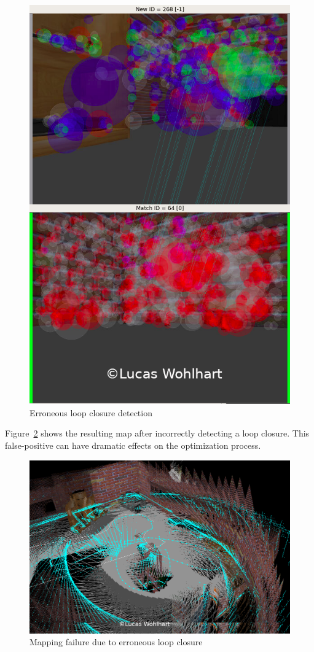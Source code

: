 \documentclass[10pt,journal,compsoc]{IEEEtran}
\begin{document}
\begin{figure}[thpb]
      \centering
      \includegraphics[width=0.65\linewidth]{img/erroneous_loop_closure_detection}
      \caption{Erroneous loop closure detection}
      \label{fig:erroneous_loop_closure_detection}
\end{figure}

Figure~\ref{fig:erroneous_loop_closure_detection_1_map} shows the resulting map after incorrectly detecting a loop closure. This false-positive can have dramatic effects on the optimization process.

\begin{figure}[thpb]
      \centering
      \includegraphics[width=\linewidth]{img/erroneous_loop_closure_detection_1_map.png}
      \caption{Mapping failure due to erroneous loop closure}
      \label{fig:erroneous_loop_closure_detection_1_map}
\end{figure}
\end{document}
